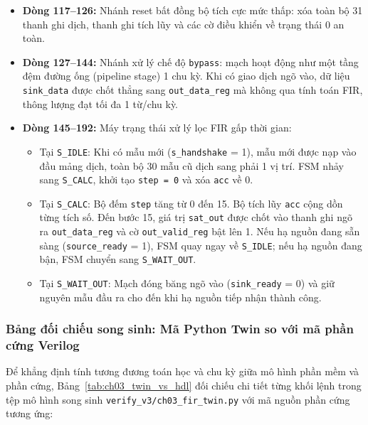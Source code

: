 \begin{itemize}[leftmargin=1.5em, itemsep=2pt]
    \item \textbf{Dòng 117--126:} Nhánh reset bất đồng bộ tích cực mức thấp: xóa toàn bộ 31 thanh ghi dịch, thanh ghi tích lũy và các cờ điều khiển về trạng thái 0 an toàn.
    \item \textbf{Dòng 127--144:} Nhánh xử lý chế độ \texttt{bypass}: mạch hoạt động như một tầng đệm đường ống (pipeline stage) 1 chu kỳ. Khi có giao dịch ngõ vào, dữ liệu \texttt{sink\_data} được chốt thẳng sang \texttt{out\_data\_reg} mà không qua tính toán FIR, thông lượng đạt tối đa 1 từ/chu kỳ.
    \item \textbf{Dòng 145--192:} Máy trạng thái xử lý lọc FIR gấp thời gian:
    \begin{itemize}
        \item Tại \texttt{S\_IDLE}: Khi có mẫu mới (\texttt{s\_handshake} = 1), mẫu mới được nạp vào đầu mảng dịch, toàn bộ 30 mẫu cũ dịch sang phải 1 vị trí. FSM nhảy sang \texttt{S\_CALC}, khởi tạo \texttt{step = 0} và xóa \texttt{acc} về 0.
        \item Tại \texttt{S\_CALC}: Bộ đếm \texttt{step} tăng từ 0 đến 15. Bộ tích lũy \texttt{acc} cộng dồn từng tích số. Đến bước 15, giá trị \texttt{sat\_out} được chốt vào thanh ghi ngõ ra \texttt{out\_data\_reg} và cờ \texttt{out\_valid\_reg} bật lên 1. Nếu hạ nguồn đang sẵn sàng (\texttt{source\_ready} = 1), FSM quay ngay về \texttt{S\_IDLE}; nếu hạ nguồn đang bận, FSM chuyển sang \texttt{S\_WAIT\_OUT}.
        \item Tại \texttt{S\_WAIT\_OUT}: Mạch đóng băng ngõ vào (\texttt{sink\_ready} = 0) và giữ nguyên mẫu đầu ra cho đến khi hạ nguồn tiếp nhận thành công.
    \end{itemize}
\end{itemize}

\subsubsection*{Bảng đối chiếu song sinh: Mã Python Twin so với mã phần cứng Verilog}
Để khẳng định tính tương đương toán học và chu kỳ giữa mô hình phần mềm và phần cứng, Bảng~\ref{tab:ch03_twin_vs_hdl} đối chiếu chi tiết từng khối lệnh trong tệp mô hình song sinh \texttt{verify\_v3/ch03\_fir\_twin.py} với mã nguồn phần cứng tương ứng:

